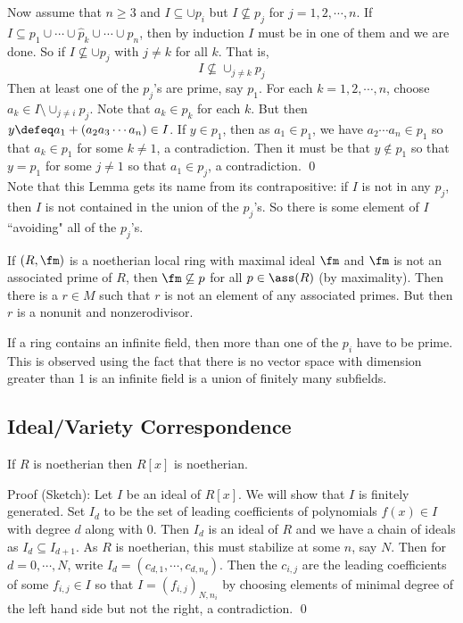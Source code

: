Now assume that $n \geq 3$ and $I \subseteq \cup p_i$ but $I \not\subseteq p_j$ for $j=1,2,\cdots,n$. If $I \subseteq p_1 \cup \cdots \cup \hat{p}_k \cup \cdots \cup p_n$, then by induction $I$ must be in one of them and we are done. So if $I \not\subseteq \cup p_j$ with $j \neq k$ for all $k$. That is, 
\[
I \not\subseteq \cup_{j \neq k} p_j
\]
Then at least one of the $p_j$'s are prime, say $p_1$. For each $k=1,2,\cdots,n$, choose $a_k \in I \setminus \cup_{j \neq i} p_j$. Note that $a_k \in p_k$ for each $k$. But then $y \defeq a_1+(a_2a_3 \cdots a_n) \in I$. If $y \in p_1$, then as $a_1 \in p_1$, we have $a_2 \cdots a_n \in p_1$ so that $a_k \in p_1$ for some $k \neq 1$, a contradiction. Then it must be that $y \notin p_1$ so that $y=p_1$ for some $j \neq 1$ so that $a_1 \in p_j$, a contradiction. \qed \\

Note that this Lemma gets its name from its contrapositive: if $I$ is not in any $p_j$, then $I$ is not contained in the union of the $p_j$'s. So there is some element of $I$ ``avoiding" all of the $p_j$'s.

\begin{ex}
If $(R,\fm)$ is a noetherian local ring with maximal ideal $\fm$ and $\fm$ is not an associated prime of $R$, then $\fm \not\subseteq p$ for all $p \in \ass(R)$ (by maximality). Then there is a $r \in M$ such that $r$ is not an element of any associated primes. But then $r$ is a nonunit and nonzerodivisor. 
\end{ex}

\begin{rem}
If a ring contains an infinite field, then more than one of the $p_i$ have to be prime. This is observed using the fact that there is no vector space with dimension greater than 1 is an infinite field is a union of finitely many subfields.
\end{rem}

\subsection{Ideal/Variety Correspondence}

\begin{thmm}
If $R$ is noetherian then $R[x]$ is noetherian.
\end{thmm}

\noindent Proof (Sketch): Let $I$ be an ideal of $R[x]$. We will show that $I$ is finitely generated. Set $I_d$ to be the set of leading coefficients of polynomials $f(x) \in I$ with degree $d$ along with 0. Then $I_d$ is an ideal of $R$ and we have a chain of ideals as $I_d \subseteq I_{d+1}$. As $R$ is noetherian, this must stabilize at some $n$, say $N$. Then for $d=0,\cdots,N$, write $I_d=(c_{d,1},\cdots,c_{d,n_d})$. Then the $c_{i,j}$ are the leading coefficients of some $f_{i,j} \in I$ so that $I=(f_{i,j})_{N,n_i}$ by choosing elements of minimal degree of the left hand side but not the right, a contradiction. \qed \\

